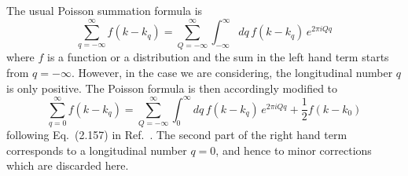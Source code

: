 \documentclass[10pt]{iopart}
\begin{document}
The usual Poisson summation formula is
\begin{equation}
\sum_{q=-\infty}^\infty f(k-k_q) = \sum_{Q=-\infty}^\infty \int_{-\infty}^{\infty} dq \, f(k-k_q) \, e^{2 \pi i Qq}
\end{equation}
where $f$ is a function or a distribution and the sum in the left hand term starts from $q=-\infty$. However, in the case we are considering, the longitudinal number $q$ is only positive. The Poisson formula is then accordingly modified to
\begin{equation}\label{eq:Poisson}
\sum_{q=0}^\infty f(k-k_q) = \sum_{Q=-\infty}^\infty \int_0^{\infty} dq \, f(k-k_q) \, e^{2 \pi i Qq} + \frac{1}{2} f(k-k_0)
\end{equation}
following Eq.~(2.157) in Ref.~\cite{brack}. The second part of the right hand term corresponds to a longitudinal number $q = 0$, and hence to minor corrections which are discarded here.


\end{document}
